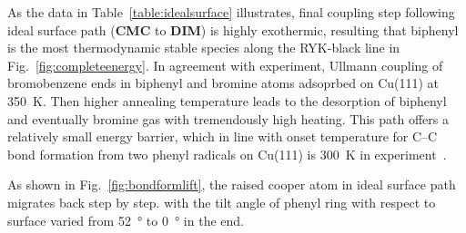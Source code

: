 \documentclass[%
 reprint,
 amsmath,amssymb,
 aps,
prb,
floatfix,
]{revtex4-2}
\newcommand{\zhzh}{\color{blue}}
\newcommand{\zhzh}{\color{black}}
\newcommand{\comm}{\color{Purple}} %
\begin{document}
{\zhzh
As the data in Table~\ref{table:idealsurface} illustrates, final coupling step following ideal surface path (\textbf{CMC} to \textbf{DIM}) is highly exothermic, resulting that biphenyl is the most thermodynamic stable species along the RYK-black line in Fig.~\ref{fig:completeenergy}. In agreement with experiment, Ullmann coupling of bromobenzene ends in biphenyl and bromine atoms adsoprbed on Cu(111) at \SI{350}{\kelvin}\cite{ullmann_67}. Then higher annealing temperature leads to the desorption of biphenyl and eventually bromine gas with tremendously high heating.
This path offers a relatively small energy barrier, which in line with onset temperature for C--C bond formation from two phenyl radicals on Cu(111) is \SI{300}{\kelvin} in experiment~\cite{sur_sci01}.

As shown in Fig.~\ref{fig:bondformlift}, the raised cooper atom in ideal surface path migrates back step by step. with the tilt angle of phenyl ring with respect to surface varied from \SI{52}{\degree} to \SI{0}{\degree} in the end.
 

 
}

\end{document}
